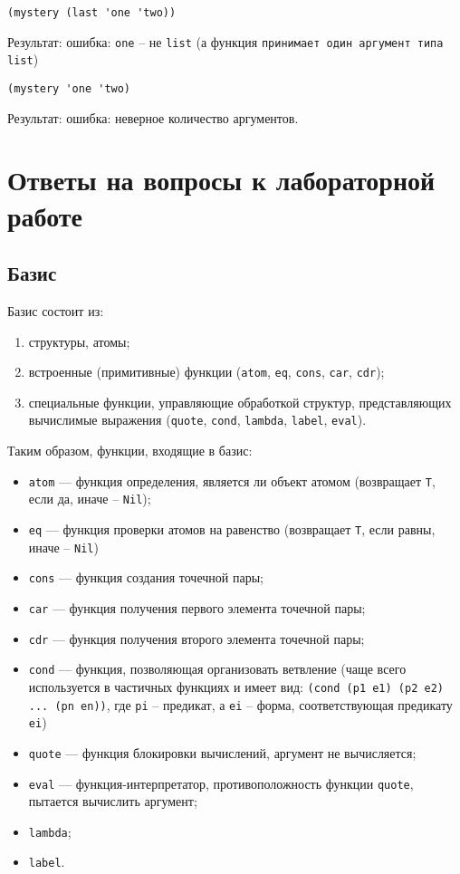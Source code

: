 \begin{lstlisting}
(mystery (last 'one 'two))
\end{lstlisting}
Результат: ошибка: \texttt{one} -- не \texttt{list} (а функция \texttt{принимает один аргумент типа \texttt{list}})
\vspace{20mm}

\begin{lstlisting}
(mystery 'one 'two)
\end{lstlisting}
Результат: ошибка: неверное количество аргументов.
\vspace{20mm}

\chapter{Ответы на вопросы к лабораторной работе}

\section{Базис}

Базис состоит из:
\begin{enumerate}
    \item структуры, атомы;
    \item встроенные (примитивные) функции (\texttt{atom}, \texttt{eq}, \texttt{cons}, \texttt{car}, \texttt{cdr});
    \item специальные функции, управляющие обработкой структур, представляющих вычислимые выражения (\texttt{quote}, \texttt{cond}, \texttt{lambda}, \texttt{label}, \texttt{eval}).
\end{enumerate}

Таким образом, функции, входящие в базис:
\begin{itemize}
    \item \texttt{atom} --- функция определения, является ли объект атомом (возвращает \texttt{T}, если да, иначе -- \texttt{Nil});
    \item \texttt{eq} --- функция проверки атомов на равенство (возвращает \texttt{T}, если равны, иначе -- \texttt{Nil})
    \item \texttt{cons} --- функция создания точечной пары;
    \item \texttt{car} --- функция получения первого элемента точечной пары;
    \item \texttt{cdr} --- функция получения второго элемента точечной пары;
    \item \texttt{cond} --- функция, позволяющая организовать ветвление (чаще всего используется в частичных функциях и имеет вид: \texttt{(cond (p1 e1) (p2 e2) ... (pn en))}, где \texttt{pi} -- предикат, а \texttt{ei} -- форма, соответствующая предикату \texttt{ei})
    \item \texttt{quote} --- функция блокировки вычислений, аргумент не вычисляется;
    \item \texttt{eval} --- функция-интерпретатор, противоположность функции \texttt{quote}, пытается вычислить аргумент;
    \item \texttt{lambda};
    \item \texttt{label}.
\end{itemize}

